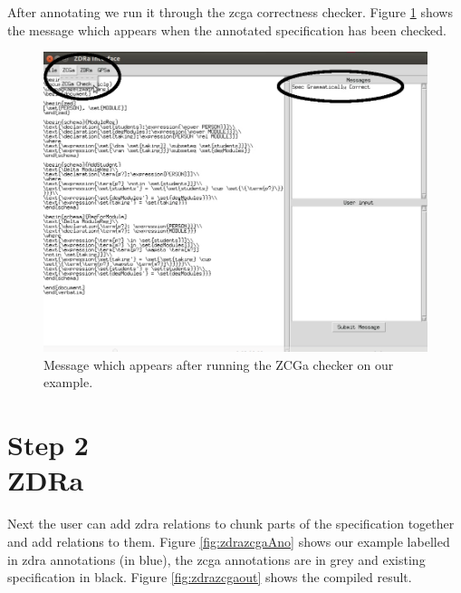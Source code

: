 After annotating we run it through the \gls{zcga} correctness checker. Figure
\ref{fig:zcgacorrect} shows the message which appears when the annotated
specification has been checked. 

\begin{figure}[H]
\centering
\includegraphics[scale=0.4]{Figures/fullexample/zcgacorrect.png}
\caption{Message which appears after running the ZCGa checker on our example. \label{fig:zcgacorrect}}
\end{figure}

\section{Step 2\\ZDRa}

Next the user can add \gls{zdra} relations to chunk parts of the specification
together and add relations to them. Figure \ref{fig:zdrazcgaAno} shows our
example labelled in \gls{zdra} annotations (in blue), the \gls{zcga} annotations
are in grey and existing specification in black. Figure \ref{fig:zdrazcgaout}
shows the compiled result.

